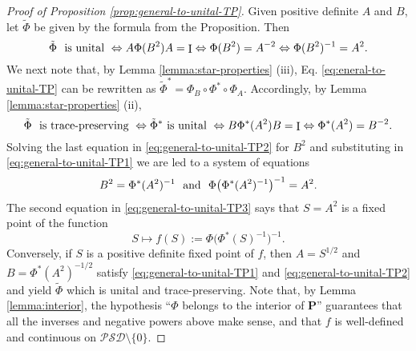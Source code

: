 \documentclass[10pt]{article}
\DeclareMathOperator{\Id}{I}
\newcommand{\PSD}{\mathcal{PSD}}
\newcommand{\cP}{\bm{P}}
\theoremstyle{plain}
\theoremstyle{definition}
\theoremstyle{remark}
\begin{document}
\begin{proof} [Proof of Proposition \ref{prop:general-to-unital-TP}]  
Given positive definite $A$ and $B$,  let $\tilde{\Phi}$ be given by the formula from the Proposition. Then 
\begin{equation}   \label{eq:general-to-unital-TP1} 
\tilde{\Phi} \ \hbox{ is unital } \Leftrightarrow A \Phi(B^2)A = \Id \Leftrightarrow  \Phi(B^2)=A^{-2} 
\Leftrightarrow \Phi(B^2)^{-1} = A^2.
\end{equation} 
We next note that, by Lemma \ref{lemma:star-properties} (iii), Eq. \eqref{eq:eneral-to-unital-TP} 
can be rewritten as 
$\tilde{\Phi}^* = \Phi_B\circ \Phi^*\circ \Phi_A$. Accordingly,    
by Lemma \ref{lemma:star-properties} (ii), 
\begin{equation} \label{eq:general-to-unital-TP2}
\tilde{\Phi} \ \hbox{ is trace-preserving } \Leftrightarrow \tilde{\Phi}^* \hbox{ is unital } \Leftrightarrow  B \Phi^*(A^2)B = \Id \Leftrightarrow  \Phi^*(A^2)=B^{-2}. %
\end{equation} 
Solving the last equation in \eqref{eq:general-to-unital-TP2} for $B^2$ and substituting in 
\eqref{eq:general-to-unital-TP1} we are led to a system of equations
\begin{equation} \label{eq:general-to-unital-TP3}
B^2 = \Phi^*(A^2)^{-1} \ \hbox{ and } \  \Phi\big(\Phi^*(A^2)^{-1}\big)^{-1} = A^2. 
\end{equation} 
The second equation in  \eqref{eq:general-to-unital-TP3}  says that $S=A^2$ 
is a fixed point of the function 
\begin{equation} \label{eq:general-to-unital-TP4}
S \mapsto f(S) := \Phi\big(\Phi^*(S)^{-1}\big)^{-1} . 
\end{equation} 
Conversely, if  $S$ is a positive definite fixed point of $f$, then $A= S^{1/2}$ and 
$B = \Phi^*(A^2)^{-1/2}$ 
satisfy \eqref{eq:general-to-unital-TP1} and  \eqref{eq:general-to-unital-TP2} and 
yield $\tilde{\Phi}$ which is unital and trace-preserving. 
Note that, by Lemma \ref{lemma:interior}, the hypothesis 
``$\Phi$ belongs to the interior of $\cP$'' guarantees that all the inverses 
and negative powers above make sense,  
and that $f$ is well-defined and continuous on $\PSD \setminus \{0\}$. 


\end{proof}
\end{document}
